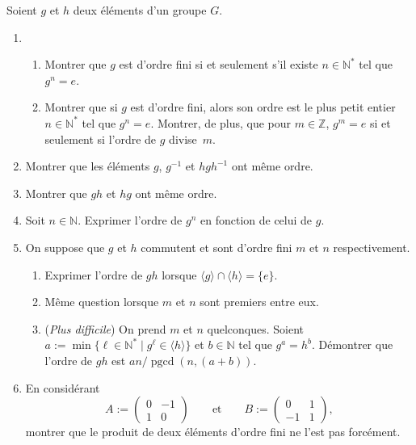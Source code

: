 \documentclass[./main]{subfiles}
\begin{document}
  \begin{enonce}
    Soient $g$ et $h$ deux éléments d'un groupe $G$.
    \begin{enumerate}
      \item 
        \begin{enumerate}
          \item Montrer que $g$ est d'ordre fini si et seulement s'il existe $n \in \mathds{N}^*$ tel que $g^n = e$.
          \item Montrer que si $g$ est d'ordre fini, alors son ordre est le plus petit entier $n \in \mathds{N}^*$ tel que $g^n = e$.
            Montrer, de plus, que pour $m \in \mathds{Z}$, $g^m = e$ si et seulement si l'ordre de  $g$ divise~$m$.
        \end{enumerate}
      \item Montrer que les éléments $g$, $g^{-1}$ et $h g h^{-1}$ ont même ordre.
      \item Montrer que $gh$ et $hg$ ont même ordre.
      \item Soit $n \in \mathds{N}$. Exprimer l'ordre de $g^n$ en fonction de celui de $g$.
      \item On suppose que $g $ et $h$ commutent et sont d'ordre fini $m$ et $n$ respectivement.
        \begin{enumerate}
          \item Exprimer l'ordre de $gh$ lorsque $\langle g\rangle \cap \langle h \rangle = \{e\}$.
          \item Même question lorsque $m$ et $n$ sont premiers entre eux.
          \item (\textit{Plus difficile}) On prend $m$ et $n$ quelconques. Soient $a := \min \{\ell \in \mathds{N}^*  \mid g^\ell \in \langle h\rangle\}$ et $b \in \mathds{N}$ tel que $g^a = h^b$.
            Démontrer que l'ordre de  $gh$ est ${an} / {\operatorname{pgcd}(n,(a+b))}$.
        \end{enumerate}
      \item En considérant \[
          A := \begin{pmatrix} 0 & -1\\ 1 & 0 \end{pmatrix} \quad\quad \text{et}\quad\quad B := \begin{pmatrix} 0 & 1\\ -1 & 1 \end{pmatrix},
        \] montrer que le produit de deux éléments d'ordre fini ne l'est pas forcément.
    \end{enumerate}
  \end{enonce}
\end{document}
